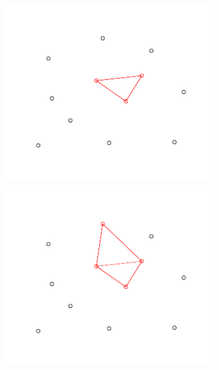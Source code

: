 \begin{figure}[h]
    \centering %
\begin{subfigure}{0.5\textwidth}
  \includegraphics[width=\linewidth]{./pictures/3/incremental_hull_1.pdf}
  \label{fig:3-douglas-peucker_1}
\end{subfigure}\hfil %
\begin{subfigure}{0.5\textwidth}
  \includegraphics[width=\linewidth]{./pictures/3/incremental_hull_2.pdf}
  \label{fig:3-douglas-peucker_2}
\end{subfigure}\hfil %

\end{figure}
